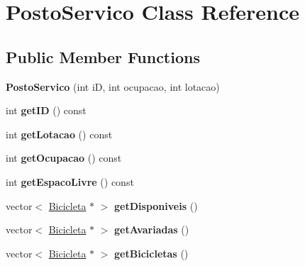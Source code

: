 \hypertarget{class_posto_servico}{\section{Posto\+Servico Class Reference}
\label{class_posto_servico}
}
\subsection*{Public Member Functions}
\begin{DoxyCompactItemize}
\item 
\hypertarget{class_posto_servico_a53b6ddb92aebadb5168570cbf9f87bae}{{\bfseries Posto\+Servico} (int i\+D, int ocupacao, int lotacao)}\label{class_posto_servico_a53b6ddb92aebadb5168570cbf9f87bae}

\item 
\hypertarget{class_posto_servico_a12d2e1c64b373009aec51fb7f4df44ec}{int {\bfseries get\+I\+D} () const }\label{class_posto_servico_a12d2e1c64b373009aec51fb7f4df44ec}

\item 
\hypertarget{class_posto_servico_a467b1b77cd1a56131f0e5a6776a55885}{int {\bfseries get\+Lotacao} () const }\label{class_posto_servico_a467b1b77cd1a56131f0e5a6776a55885}

\item 
\hypertarget{class_posto_servico_a2f09c305c18b3c08686a852e2e8702ac}{int {\bfseries get\+Ocupacao} () const }\label{class_posto_servico_a2f09c305c18b3c08686a852e2e8702ac}

\item 
\hypertarget{class_posto_servico_a9efdef3b0af8965d366dacb6e61bb6d9}{int {\bfseries get\+Espaco\+Livre} () const }\label{class_posto_servico_a9efdef3b0af8965d366dacb6e61bb6d9}

\item 
\hypertarget{class_posto_servico_a0d3be8347bcfe2ff61915f0fe4688f11}{vector$<$ \hyperlink{class_bicicleta}{Bicicleta} $\ast$ $>$ {\bfseries get\+Disponiveis} ()}\label{class_posto_servico_a0d3be8347bcfe2ff61915f0fe4688f11}

\item 
\hypertarget{class_posto_servico_ae2675fbf3044cd0cc366fbec67449969}{vector$<$ \hyperlink{class_bicicleta}{Bicicleta} $\ast$ $>$ {\bfseries get\+Avariadas} ()}\label{class_posto_servico_ae2675fbf3044cd0cc366fbec67449969}

\item 
\hypertarget{class_posto_servico_a747fd34e7c83f28f1697284b6e139e2e}{vector$<$ \hyperlink{class_bicicleta}{Bicicleta} $\ast$ $>$ {\bfseries get\+Bicicletas} ()}\label{class_posto_servico_a747fd34e7c83f28f1697284b6e139e2e}


\end{DoxyCompactItemize}
